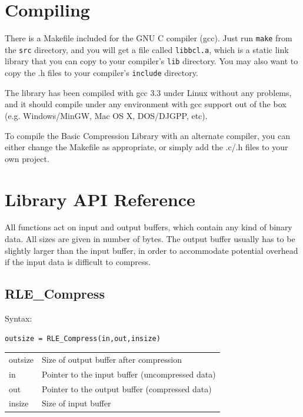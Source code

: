 \documentclass[a4paper,11pt,oneside]{report}
\begin{document}
\chapter{Compiling}
\thispagestyle{fancy}

There is a Makefile included for the GNU C compiler (gcc). Just run
\texttt{make} from the \texttt{src} directory, and you will get a file
called \texttt{libbcl.a}, which is a static link library that you can copy
to your compiler's \texttt{lib} directory. You may also want to copy the
.h files to your compiler's \texttt{include} directory.

The library has been compiled with gcc 3.3 under Linux without any
problems, and it should compile under any environment with gcc support
out of the box (e.g. Windows/MinGW, Mac OS X, DOS/DJGPP, etc).

To compile the Basic Compression Library with an alternate compiler, you
can either change the Makefile as appropriate, or simply add the .c/.h
files to your own project.


\chapter{Library API Reference}
\thispagestyle{fancy}

All functions act on input and output buffers, which contain any kind of
binary data. All sizes are given in number of bytes. The output buffer
usually has to be slightly larger than the input buffer, in order to
accommodate potential overhead if the input data is difficult to compress.

\section{RLE\_Compress}
Syntax:
\begin{lstlisting}
outsize = RLE_Compress(in,out,insize)
\end{lstlisting}

\begin{tabular}{ll}
outsize & Size of output buffer after compression\\
in      & Pointer to the input buffer (uncompressed data)\\
out     & Pointer to the output buffer (compressed data)\\
insize  & Size of input buffer
\end{tabular}
\end{document}
